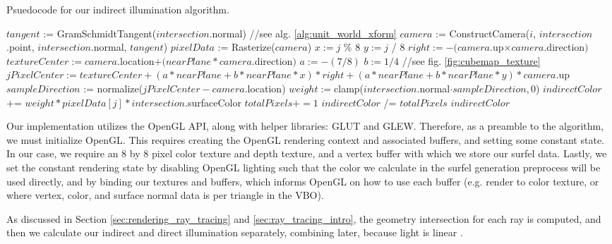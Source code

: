 \begin{algorithm}
\captionfont
\caption[Indirect illumination]{Psuedocode for our indirect illumination algorithm.}
\label{alg:indirect_illum}
{\fontsize{10}{9}\selectfont
\begin{algorithmic}
      \State $tangent$ := GramSchmidtTangent($intersection$.normal) //see alg. \ref{alg:unit_world_xform}
         \State $camera$ := ConstructCamera($i$, $intersection$.point, $intersection$.normal, $tangent$)
         \State $pixelData$ := Rasterize($camera$)
            \State $x := j$ \% $8$
            \State $y := j$ / $8$
            \State $right := -(camera.$up$ \times camera.$direction$)$
            \State $textureCenter := camera.$location$ + (nearPlane * camera.$direction$)$
            \State $a := -(7/8)$
            \State $b := 1/4$
            \State //see fig. \ref{fig:cubemap_texture}
            \State $jPixelCenter := textureCenter + (a*nearPlane + b*nearPlane*x)*right + (a*nearPlane + b*nearPlane*y)*camera.$up
            \State $sampleDirection$ := normalize($jPixelCenter - camera.$location)
            \State $weight := $clamp($intersection$.normal$ \cdot sampleDirection, 0$)
               \State $indirectColor$ += $weight * pixelData[j] * intersection$.surfaceColor
               \State $totalPixels += 1$
            \EndIf
         \EndFor
      \EndFor
      \State $indirectColor$ /= $totalPixels$
      \State \Return $indirectColor$
   \EndFunction
\end{algorithmic}
}
\end{algorithm}

Our implementation utilizes the OpenGL API, along with helper libraries: GLUT and GLEW. Therefore, as a preamble to the algorithm, we must initialize OpenGL. This requires creating the OpenGL rendering context and associated buffers, and setting some constant state. In our case, we require an 8 by 8 pixel color texture and depth texture, and a vertex buffer with which we store our surfel data. Lastly, we set the constant rendering state by disabling OpenGL lighting such that the color we calculate in the surfel generation preprocess will be used directly, and by binding our textures and buffers, which informs OpenGL on how to use each buffer (e.g. render to color texture, or where vertex, color, and surface normal data is per triangle in the VBO).

As discussed in Section \ref{sec:rendering_ray_tracing} and \ref{sec:ray_tracing_intro}, the geometry intersection for each ray is computed, and then we calculate our indirect and direct illumination separately, combining later, because light is linear \cite{bib:pbr}.

